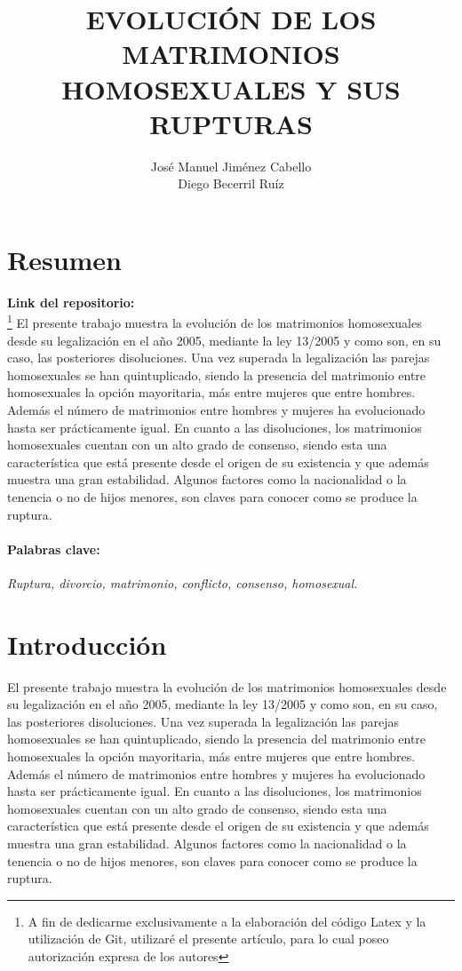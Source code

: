 \documentclass{article}
\begin{document}
	\title{\textbf{\Huge{EVOLUCIÓN DE LOS MATRIMONIOS HOMOSEXUALES Y SUS RUPTURAS}}}
	\author{José Manuel Jiménez Cabello \\ Diego Becerril Ruíz}
	\maketitle
	\newpage
	
	\tableofcontents
	\newpage
	
	\section{Resumen} 
	

\textbf{Link del repositorio:} \\

	\footnote[1]{A fin de dedicarme exclusivamente a la elaboración del código Latex y la utilización de Git, utilizaré el presente artículo, para lo cual poseo autorización expresa de los autores}
El presente trabajo muestra la evolución de los matrimonios homosexuales desde su legalización en el año 2005, mediante la ley 13/2005 y como son, en su caso, las posteriores disoluciones. Una vez superada la legalización las parejas homosexuales se han quintuplicado, siendo la presencia del matrimonio entre homosexuales la opción mayoritaria, más entre mujeres que entre hombres. Además el número de matrimonios entre hombres y mujeres ha evolucionado hasta ser prácticamente igual. En cuanto a las disoluciones, los matrimonios homosexuales cuentan con un alto grado de consenso, siendo esta una característica que está presente desde el origen de su existencia y que además muestra una gran estabilidad. Algunos factores como la nacionalidad o la tenencia o no de hijos menores, son claves para conocer como se produce la ruptura.
\paragraph{Palabras clave:}
 \textit{Ruptura, divorcio, matrimonio, conflicto, consenso, homosexual.}
\section{Introducción}
El presente trabajo muestra la evolución de los matrimonios homosexuales desde su legalización en el año 2005, mediante la ley 13/2005 y como son, en su caso, las posteriores disoluciones. Una vez superada la legalización las parejas homosexuales se han quintuplicado, siendo la presencia del matrimonio entre homosexuales la opción mayoritaria, más entre mujeres que entre hombres. Además el número de matrimonios entre hombres y mujeres ha evolucionado hasta ser prácticamente igual. En cuanto a las disoluciones, los matrimonios homosexuales cuentan con un alto grado de consenso, siendo esta una característica que está presente desde el origen de su existencia y que además muestra una gran estabilidad. Algunos factores como la nacionalidad o la tenencia o no de hijos menores, son claves para conocer como se produce la ruptura.
\end{document}
